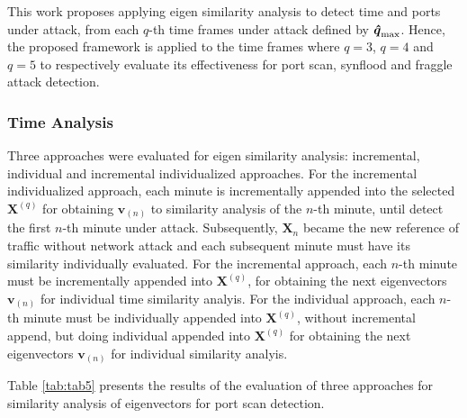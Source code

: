 This work proposes applying eigen similarity analysis to detect time and ports under attack, from each $q$-th time frames under attack defined by $\rm{\boldsymbol{\hat{q}}}_{\rm max}$. Hence, the proposed framework is applied to the time frames where $q=3$, $q=4$ and $q=5$ to respectively evaluate its effectiveness for port scan, synflood and fraggle attack detection.

\subsubsection{Time Analysis}
\label{sec:2_TimeAnalysis}

Three approaches were evaluated for eigen similarity analysis: incremental, individual and incremental individualized approaches. For the incremental individualized approach, each minute is incrementally appended into the selected $\boldsymbol{X}^{(q)}$ for obtaining $\boldsymbol{v}_{(n)}$ to similarity analysis of the $n$-th minute, until detect the first $n$-th minute under attack. Subsequently, $\boldsymbol{X}_n$ became the new reference of traffic without network attack and each subsequent minute must have its similarity individually evaluated. For the incremental approach, each $n$-th minute must be incrementally appended into $\boldsymbol{X}^{(q)}$, for obtaining the next eigenvectors $\boldsymbol{v}_{(n)}$ for individual time similarity analyis. For the individual approach, each $n$-th minute must be individually appended into $\boldsymbol{X}^{(q)}$, without incremental append, but doing individual appended into $\boldsymbol{X}^{(q)}$ for obtaining the next eigenvectors $\boldsymbol{v}_{(n)}$ for individual similarity analyis.

Table \ref{tab:tab5} presents the results of the evaluation of three approaches for similarity analysis of eigenvectors for port scan detection.

